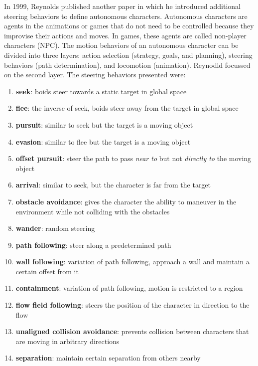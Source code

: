 In 1999, Reynolds published another paper in which he introduced additional steering 
behaviors to define autonomous characters\cite{craigSteeringBehaviors}. 
Autonomous characters are agents in the animations or games that do not need to be 
controlled because they improvise their actions and moves. In games, these agents are 
called non-player characters (NPC). The motion behaviors of an autonomous character 
can be divided into three layers: action selection (strategy, goals, and planning), steering behaviors (path determination), 
and locomotion (animation). 
Reynodld focussed on the second layer. The steering behaviors presented were:
\begin{enumerate}
\item \textbf{seek}: boids steer towards a static target in global space
\item \textbf{flee}: the inverse of seek, boids steer away from the target in global space
\item \textbf{pursuit}: similar to seek but the target is a moving object
\item \textbf{evasion}: similar to flee but the target is a moving object
\item \textbf{offset pursuit}: steer the path to pass \textit{near to} but not \textit{directly to} the moving object
\item \textbf{arrival}: similar to seek, but the character is far from the target
\item \textbf{obstacle avoidance}: gives the character the ability to maneuver in the environment while not colliding with the obstacles 
\item \textbf{wander}: random steering
\item \textbf{path following}: steer along a predetermined path
\item \textbf{wall following}: variation of path following, approach a wall and maintain a certain offset from it
\item \textbf{containment}: variation of path following, motion is restricted to a region
\item \textbf{flow field following}: steers the position of the character in direction to the flow
\item \textbf{unaligned collision avoidance}: prevents collision between characters that are moving in arbitrary directions
\item \textbf{separation}: maintain certain separation from others nearby

\end{enumerate}

